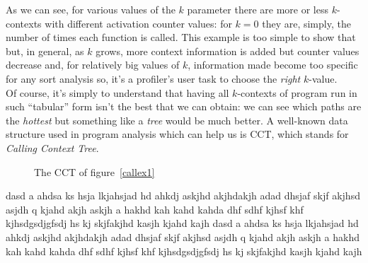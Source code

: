 \documentclass[a4paper,11pt]{report}
\begin{document}
As we can see, for various values of the $k$ parameter there are more or less $k$-contexts with different activation counter values: for $k=0$ they are, simply, the number of times each function is called. This example is too simple to show that but, in general, as $k$ grows, more context information is added but counter values decrease and, for relatively big values of $k$, information made become too specific for any sort analysis so, it's a profiler's user task to choose the \emph{right} $k$-value.\\
Of course, it's simply to understand that having all $k$-contexts of program run in such ``tabular'' form isn't the best that we can obtain: we can see which paths are the \emph{hottest} but something like a \emph{tree} would be much better. 
A well-known data structure used in program analysis which can help us is CCT, which stands for \emph{Calling Context Tree}.

\begin{figure}[t]

\begin{center}
\end{center}

\caption{The CCT of figure~\ref{callex1}}
\label{cct1}

\end{figure}

dasd a ahdsa ks hsja   lkjahsjad hd ahkdj askjhd akjhdakjh adad
dhsjaf skjf akjhsd asjdh q kjahd akjh askjh a hakhd kah kahd kahda
dhf sdhf kjhsf khf kjhsdgsdjgfsdj hs kj  skjfakjhd kasjh kjahd kajh 
dasd a ahdsa ks hsja   lkjahsjad hd ahkdj askjhd akjhdakjh adad
dhsjaf skjf akjhsd asjdh q kjahd akjh askjh a hakhd kah kahd kahda
dhf sdhf kjhsf khf kjhsdgsdjgfsdj hs kj  skjfakjhd kasjh kjahd kajh 
\end{document}
